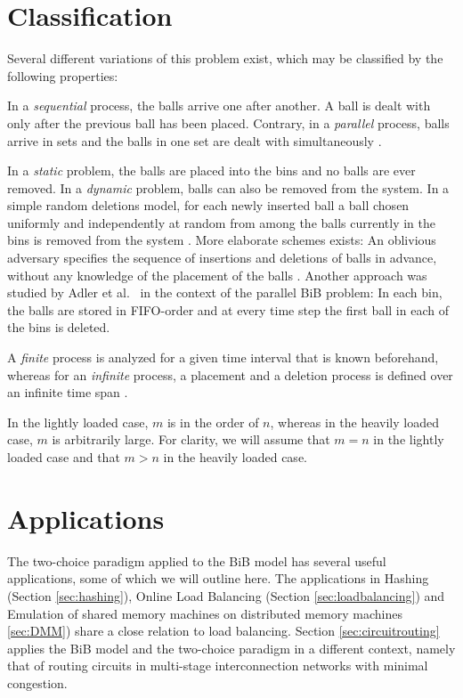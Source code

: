 \documentclass[a4paper,12pt]{article}
\begin{document}
\section{Classification}
\label{sec:classification}
Several different variations of this problem exist, which may be classified by the following properties:
\begin{compactitem}
\item In a \emph{sequential} process, the balls arrive one after another. A  ball is dealt with only after the previous ball has been placed. Contrary, in a \emph{parallel} process, balls arrive in sets and the balls in one set are dealt with simultaneously \cite{ABS98}. 
\item In a \emph{static} problem, the balls are placed into the bins and no balls are ever removed. In a \emph{dynamic} problem, balls can also be removed from the system. In a simple random deletions model, for each newly inserted ball a ball chosen uniformly and independently at random from among the balls currently in the bins is removed from the system \cite{ABKU99} \cite{MRS01}. More elaborate schemes exists: An oblivious adversary specifies the sequence of insertions and deletions of balls in advance, without any knowledge of the placement of the balls \cite{CFM+98}. Another approach was studied by Adler et al.~\cite{ABS98} in the context of the parallel BiB problem: In each bin, the balls are stored in FIFO-order and at every time step the first ball in each of the bins is deleted. 
\item A \emph{finite} process is analyzed for a given time interval that is known beforehand, whereas for an \emph{infinite} process, a placement and a deletion process is defined over an infinite time span \cite{ABS98}.
\item In the lightly loaded case, $m$ is in the order of $n$, whereas in the heavily loaded case, $m$ is arbitrarily large. For clarity, we will assume that $m = n$ in the lightly loaded case and that $m > n$ in the heavily loaded case. 
\end{compactitem}

\section{Applications}
\label{sec:applications}
The two-choice paradigm applied to the BiB model has several useful applications, some of which we will outline here. The applications in Hashing (Section \ref{sec:hashing}), Online Load Balancing (Section \ref{sec:loadbalancing}) and Emulation of shared memory machines on distributed memory machines \ref{sec:DMM}) share a close relation to load balancing. Section \ref{sec:circuitrouting} applies the BiB model and the two-choice paradigm in a different context, namely that of routing circuits in multi-stage interconnection networks with minimal congestion.
\end{document}
